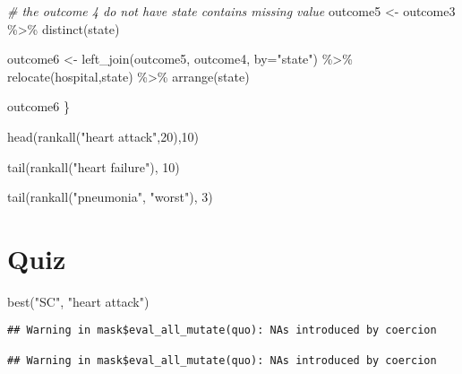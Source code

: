 \documentclass[
]{article}
\newenvironment{Shaded}{\begin{snugshade}}{\end{snugshade}}
\newcommand{\AttributeTok}[1]{\textcolor[rgb]{0.77,0.63,0.00}{#1}}
\newcommand{\CommentTok}[1]{\textcolor[rgb]{0.56,0.35,0.01}{\textit{#1}}}
\newcommand{\DecValTok}[1]{\textcolor[rgb]{0.00,0.00,0.81}{#1}}
\newcommand{\FunctionTok}[1]{\textcolor[rgb]{0.00,0.00,0.00}{#1}}
\newcommand{\NormalTok}[1]{#1}
\newcommand{\OtherTok}[1]{\textcolor[rgb]{0.56,0.35,0.01}{#1}}
\newcommand{\SpecialCharTok}[1]{\textcolor[rgb]{0.00,0.00,0.00}{#1}}
\newcommand{\StringTok}[1]{\textcolor[rgb]{0.31,0.60,0.02}{#1}}
\begin{document}
\begin{Shaded}
\begin{Highlighting}[]
            \CommentTok{\# the outcome 4 do not have state contains missing value}
\NormalTok{            outcome5 }\OtherTok{\textless{}{-}}\NormalTok{ outcome3 }\SpecialCharTok{\%\textgreater{}\%}
              \FunctionTok{distinct}\NormalTok{(state)}

\NormalTok{            outcome6 }\OtherTok{\textless{}{-}} \FunctionTok{left\_join}\NormalTok{(outcome5, outcome4, }\AttributeTok{by=}\StringTok{"state"}\NormalTok{) }\SpecialCharTok{\%\textgreater{}\%}
              \FunctionTok{relocate}\NormalTok{(hospital,state) }\SpecialCharTok{\%\textgreater{}\%}
              \FunctionTok{arrange}\NormalTok{(state)}

\NormalTok{            outcome6}
\NormalTok{\}}
\end{Highlighting}
\end{Shaded}

\begin{Shaded}
\begin{Highlighting}[]
\FunctionTok{head}\NormalTok{(}\FunctionTok{rankall}\NormalTok{(}\StringTok{"heart attack"}\NormalTok{,}\DecValTok{20}\NormalTok{),}\DecValTok{10}\NormalTok{)}

\FunctionTok{tail}\NormalTok{(}\FunctionTok{rankall}\NormalTok{(}\StringTok{"heart failure"}\NormalTok{), }\DecValTok{10}\NormalTok{)}

\FunctionTok{tail}\NormalTok{(}\FunctionTok{rankall}\NormalTok{(}\StringTok{"pneumonia"}\NormalTok{, }\StringTok{"worst"}\NormalTok{), }\DecValTok{3}\NormalTok{)}
\end{Highlighting}
\end{Shaded}

\hypertarget{quiz}{%
\section{Quiz}\label{quiz}}

\begin{Shaded}
\begin{Highlighting}[]
\FunctionTok{best}\NormalTok{(}\StringTok{"SC"}\NormalTok{, }\StringTok{"heart attack"}\NormalTok{)}
\end{Highlighting}
\end{Shaded}

\begin{verbatim}
## Warning in mask$eval_all_mutate(quo): NAs introduced by coercion

## Warning in mask$eval_all_mutate(quo): NAs introduced by coercion
\end{verbatim}
\end{document}
